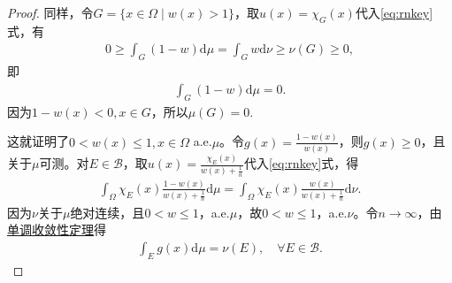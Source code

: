 \documentclass[../../main.tex]{subfiles}%
\begin{document}
\begin{proof}
同样，令$G=\{x\in\Omega\mid w(x)>1\}$，取$u(x)=\chi_G(x)$代入\eqref{eq:rnkey}式，有
\begin{align*}
0\geqslant\int_G (1-w)\mathrm{d}\mu=\int_G w\mathrm{d}\nu\geqslant\nu(G)\geqslant 0,
\end{align*}
即
\begin{align*}
\int_G (1-w)\mathrm{d}\mu=0.
\end{align*}
因为$1-w(x)<0,x\in G$，所以$\mu(G)=0$.

这就证明了$0<w(x)\leqslant 1,x\in\Omega$ a.e.$\mu$。令$g(x)=\frac{1-w(x)}{w(x)}$，则$g(x)\geqslant 0$，且关于$\mu$可测。对$E\in\mathcal{B}$，取$u(x)=\frac{\chi_E(x)}{w(x)+\frac{1}{n}}$代入\eqref{eq:rnkey}式，得
\begin{align}\label{eq:HIOUWJOIO23804723847892378941}
\int_\Omega \chi_E(x)\frac{1-w(x)}{w(x)+\frac{1}{n}}\mathrm{d}\mu=\int_\Omega \chi_E(x)\frac{w(x)}{w(x)+\frac{1}{n}}\mathrm{d}\nu.
\end{align}
因为$\nu$关于$\mu$绝对连续，且$0<w\leqslant 1$，a.e.$\mu$，故$0<w\leqslant 1$，a.e.$\nu$。令$n\to\infty$，由\hyperref[Real Analysis-theorem:Beppo Levi非负渐升列积分定理]{单调收敛性定理}得
\begin{align}\label{eqFJKUHIOW94023890}
\int_E g(x)\mathrm{d}\mu=\nu(E),\quad \forall E\in\mathcal{B}.
\end{align}


\end{proof}
\end{document}
